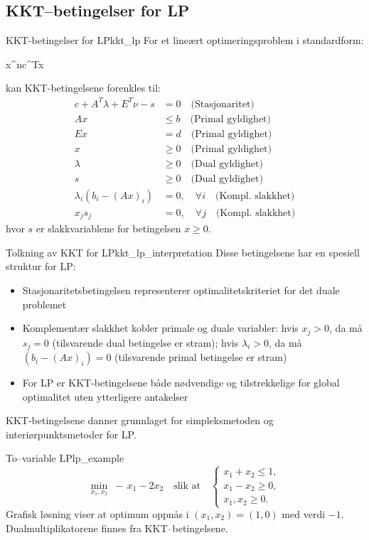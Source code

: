 \subsection{KKT--betingelser for LP}

\begin{theorem}{KKT-betingelser for LP}{kkt_lp}
	For et lineært optimeringsproblem i standardform:
	\begin{mini*}
		{x\in\R^n}{c^Tx}{}{}
	\end{mini*}
	kan KKT-betingelsene forenkles til:
	\begin{align}
		c + A^T\lambda + E^T\nu - s &= 0 \quad\text{(Stasjonaritet)}\\
		Ax &\le b \quad\text{(Primal gyldighet)}\\
		Ex &= d \quad\text{(Primal gyldighet)}\\
		x &\ge 0 \quad\text{(Primal gyldighet)}\\
		\lambda &\ge 0 \quad\text{(Dual gyldighet)}\\
		s &\ge 0 \quad\text{(Dual gyldighet)}\\
		\lambda_i(b_i - (Ax)_i) &= 0, \quad\forall i \quad\text{(Kompl. slakkhet)}\\
		x_js_j &= 0, \quad\forall j \quad\text{(Kompl. slakkhet)}
	\end{align}
	hvor $s$ er slakkvariablene for betingelsen $x \ge 0$.
\end{theorem}

\begin{remark}{Tolkning av KKT for LP}{kkt_lp_interpretation}
	Disse betingelsene har en spesiell struktur for LP:
	\begin{itemize}
		\item Stasjonaritetsbetingelsen representerer optimalitetskriteriet for det duale problemet
		\item Komplementær slakkhet kobler primale og duale variabler: hvis $x_j > 0$, da må $s_j = 0$ (tilsvarende dual betingelse er stram); hvis $\lambda_i > 0$, da må $(b_i - (Ax)_i) = 0$ (tilsvarende primal betingelse er stram)
		\item For LP er KKT-betingelsene både nødvendige og tilstrekkelige for global optimalitet uten ytterligere antakelser
	\end{itemize}
	KKT-betingelsene danner grunnlaget for simpleksmetoden og interiørpunktsmetoder for LP.
\end{remark}
\begin{example}{To--variable LP}{lp_example}
	\[
		\min_{x_1,x_2}\;-\,x_1 - 2x_2
		\quad\text{slik at}\quad
		\begin{cases}
			x_1 + x_2 \le 1, \\
			x_1 - x_2 \ge 0, \\
			x_1,x_2\ge0.
		\end{cases}
	\]
	Grafisk løsning viser at optimum oppnås i $(x_1,x_2)=(1,0)$ med verdi $-1$. Dualmultiplikatorene finnes fra KKT--betingelsene.
\end{example}

